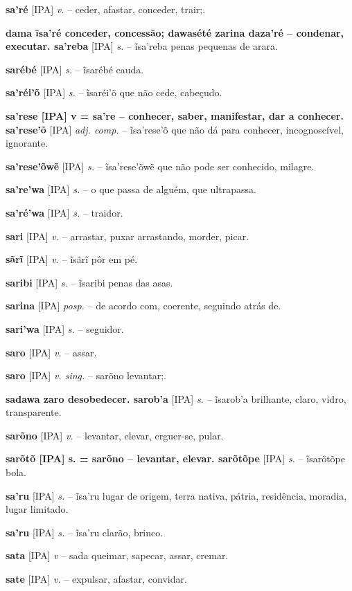 {\textbf{sa'ré} [IPA] \textit{v.} -- ceder, afastar, conceder, trair;.

\textbf{dama ĩsa'ré conceder, concessão; dawasété zarina daza'ré -- condenar, executar. sa'reba} [IPA] \textit{s.} -- ĩsa'reba penas pequenas de arara.

\textbf{sarébé} [IPA] \textit{s.} -- ĩsarébé cauda.

\textbf{sa'réi'õ} [IPA] \textit{s.} -- ĩsaréi'õ que não cede, cabeçudo.

\textbf{sa'rese [IPA] v = sa're -- conhecer, saber, manifestar, dar a conhecer. sa'rese'õ} [IPA] \textit{adj. comp.} -- ĩsa'rese'õ que não dá para conhecer, incognoscível, ignorante.

\textbf{sa'rese'õwẽ} [IPA] \textit{s.} -- ĩsa'rese'õwẽ que não pode ser conhecido, milagre.

\textbf{sa're'wa} [IPA] \textit{s.} -- o que passa de alguém, que ultrapassa.

\textbf{sa'ré'wa} [IPA] \textit{s.} -- traidor.

\textbf{sari} [IPA] \textit{v.} -- arrastar, puxar arrastando, morder, picar.

\textbf{sãrĩ} [IPA] \textit{v.} -- ĩsãrĩ pôr em pé.

\textbf{saribi} [IPA] \textit{s.} -- ĩsaribi penas das asas.

\textbf{sarina} [IPA] \textit{posp.} -- de acordo com, coerente, seguindo atrás de.

\textbf{sari'wa} [IPA] \textit{s.} -- seguidor.

\textbf{saro} [IPA] \textit{v.} -- assar.

\textbf{saro} [IPA] \textit{v. sing.} -- sarõno levantar;.

\textbf{sadawa zaro desobedecer. sarob'a} [IPA] \textit{s.} -- ĩsarob'a brilhante, claro, vidro, transparente.

\textbf{sarõno} [IPA] \textit{v.} -- levantar, elevar, erguer-se, pular.

\textbf{sarõtõ [IPA] s. = sarõno -- levantar, elevar. sarõtõpe} [IPA] \textit{s.} -- ĩsarõtõpe bola.

\textbf{sa'ru} [IPA] \textit{s.} -- ĩsa'ru lugar de origem, terra nativa, pátria, residência, moradia, lugar limitado.

\textbf{sa'ru} [IPA] \textit{s.} -- ĩsa'ru clarão, brinco.

\textbf{sata} [IPA] \textit{v} -- sada queimar, sapecar, assar, cremar.

\textbf{sate} [IPA] \textit{v.} -- expulsar, afastar, convidar.

}
